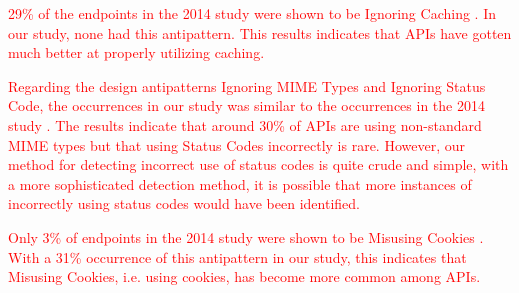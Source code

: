 \textcolor{red}{
29\% of the endpoints in the 2014 study were shown to be Ignoring Caching \cite{design}. In our study, none had this antipattern. This results indicates that APIs have gotten much better at properly utilizing caching. 
}

\textcolor{red}{
Regarding the design antipatterns Ignoring MIME Types and Ignoring Status Code, the occurrences in our study was similar to the occurrences in the 2014 study \cite{design}. The results indicate that around 30\% of APIs are using non-standard MIME types but that using Status Codes incorrectly is rare. However, our method for detecting incorrect use of status codes is quite crude and simple, with a more sophisticated detection method, it is possible that more instances of incorrectly using status codes would have been identified. 
}

\textcolor{red}{
Only 3\% of endpoints in the 2014 study were shown to be Misusing Cookies \cite{design}. With a 31\% occurrence of this antipattern in our study, this indicates that Misusing Cookies, i.e. using cookies, has become more common among APIs. 
}

\clearpage
\newpage